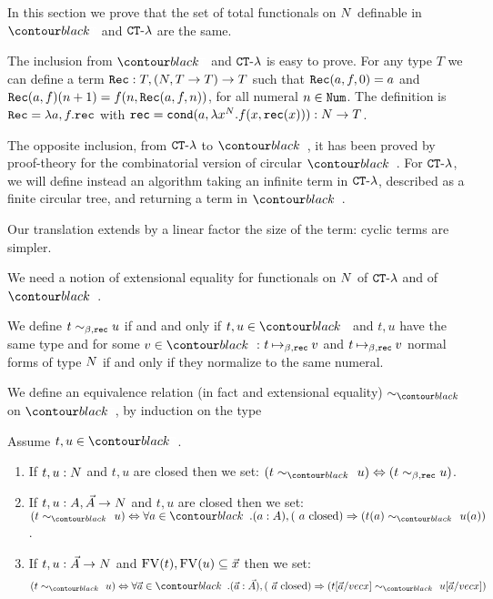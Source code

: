 In this section we prove that the set of total functionals on ${N}$ definable in 
$\systemT$ and ${ {\tt CT} \mbox{-} \lambda}$ are the same.

The inclusion from $\systemT$ and ${ {\tt CT} \mbox{-} \lambda}$ is easy to prove.
For any type $T$ we can define a term ${\tt Rec}:T,({N},T \rightarrow T)\rightarrow T$ such that
${\tt Rec}(a,f,0) = a$ and ${\tt Rec}(a,f)(n+1) = f(n,{\tt Rec}(a,f,n))$, for all numeral $n \in {\tt Num}$.
The definition is ${\tt Rec} = \lambda a,f.{\tt rec}$ 
with ${\tt rec} = {\tt cond} (a,\lambda x^{{N}}.f(x,{\tt rec}(x))) : {N} \rightarrow T$.

The opposite inclusion, from ${ {\tt CT} \mbox{-} \lambda}$ to $\systemT$, it has been proved by proof-theory for the
combinatorial version of circular $\systemT$. For ${ {\tt CT} \mbox{-} \lambda}$, we will define instead an algorithm
taking an infinite term in  ${ {\tt CT} \mbox{-} \lambda}$, described as a finite circular tree, 
and returning a term in $\systemT$. 

Our translation extends by a linear factor the size of the term: cyclic terms are simpler.

We need a notion of extensional equality for  functionals on ${N}$ of ${ {\tt CT} \mbox{-} \lambda}$ and of $\systemT$. 

We define $t \sim_{\beta,{\tt rec}} u$ if and and only if $t, u \in \systemT$ and $t,u$ have the same type
and for some $v \in \systemT$: $t \mathbin{\mapsto}_{\beta,{\tt rec}} v$ and $t \mathbin{\mapsto}_{\beta,{\tt rec}} v$
normal forms of type ${N}$ if and only if they normalize to the same numeral.

We define an equivalence relation (in fact and extensional equality) 
$\sim_{\systemT}$ on $\systemT$, by induction on the type 


\begin{definition}
Assume $t,u \in \systemT$.
\begin{enumerate}
\item
If $t,u:{N}$ and $t,u$ are closed then we set: 
$(t \sim_{\systemT} u) \Leftrightarrow  (t \sim_{\beta,\rec} u)$.
\item
If $t,u:A,\vec{A}\rightarrow{N}$ and $t,u$ are closed then we set: 
$(t \sim_{\systemT} u) \Leftrightarrow  
\forall a \in \systemT. (a:A), (\mbox{ $a$ closed}) \Rightarrow (t(a) \sim_{\systemT} u(a))$.
\item
If $t,u:\vec{A}\rightarrow{N}$ and ${{\rm FV}}(t), {{\rm FV}}(u) \subseteq \vec{x}$ then we set:
$$
(t \sim_{\systemT} u) 
\Leftrightarrow  
\forall \vec{a} \in \systemT. 
(\vec{a}:\vec{A}), (\mbox{ $\vec{a}$ closed})  
\Rightarrow 
(t[\vec{a}/vec{x}] \sim_{\systemT} u[\vec{a}/vec{x}])
$$
\end{enumerate}
\end{definition}

